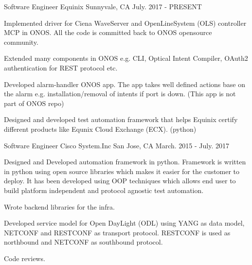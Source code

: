 

\begin{cventries}

  \cventry
    {Software Engineer} %
    {Equinix} %
    {Sunnyvale, CA} %
    {July. 2017 - PRESENT} %
    {
      \begin{cvitems} %
        \item {Implemented driver for Ciena WaveServer and OpenLineSystem (OLS) controller MCP in ONOS.
               All the code is committed back to ONOS opensource community.}\
        \item {Extended many components in ONOS e.g. CLI, Optical Intent Compiler, OAuth2
               authentication for REST protocol etc.}
        \item {Developed alarm-handler ONOS app. The app takes well defined
               actions base on the alarm e.g. installation/removal of intents if port is down.
               (This app is not part of ONOS repo)}
        \item {Designed and developed test automation framework that helps Equinix certify different
               products like Equnix Cloud Exchange (ECX). (python)}
      \end{cvitems}
    }

  \cventry
    {Software Engineer} %
    {Cisco System.Inc} %
    {San Jose, CA} %
    {March. 2015 - July. 2017} %
    {
      \begin{cvitems} %
        \item {Designed and Developed automation framework in python.
                Framework is written in python using open source libraries which makes it easier for the customer to deploy.
                It has been developed using OOP techniques which allows end user to build platform independent and protocol agnostic test automation.}
        \item {Wrote backend libraries for the infra.}
        \item {Developed service model for Open DayLight (ODL) using YANG as data model, NETCONF and RESTCONF as transport protocol.
        		RESTCONF is used as northbound and NETCONF as southbound protocol.}
        \item {Code reviews.}
      \end{cvitems}
    }


\end{cventries}
